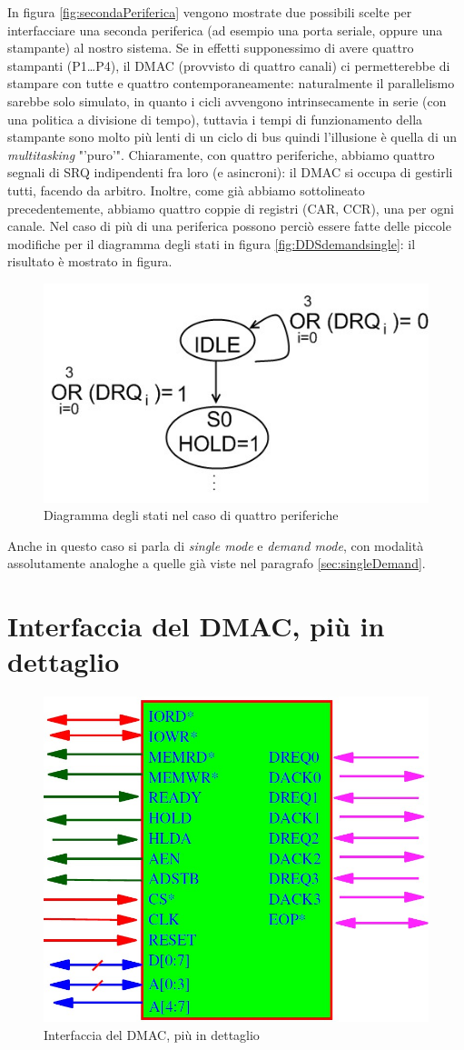 In figura \ref{fig:secondaPeriferica} vengono mostrate due possibili scelte per interfacciare una seconda periferica (ad esempio una porta seriale, oppure una stampante) al nostro sistema.
Se in effetti supponessimo di avere quattro stampanti (P1\ldots P4), il DMAC (provvisto di quattro canali) ci permetterebbe di stampare con tutte e quattro contemporaneamente: naturalmente il parallelismo sarebbe solo simulato, in quanto i cicli avvengono intrinsecamente in serie (con una politica a divisione di tempo), tuttavia i tempi di funzionamento della stampante sono molto più lenti di un ciclo di bus quindi l'illusione è quella di un \textit{multitasking} "'puro'".
Chiaramente, con quattro periferiche, abbiamo quattro segnali di SRQ indipendenti fra loro (e asincroni): il DMAC si occupa di gestirli tutti, facendo da arbitro. Inoltre, come già abbiamo sottolineato precedentemente, abbiamo quattro coppie di registri (CAR, CCR), una per ogni canale. 
Nel caso di più di una periferica possono perciò essere fatte delle piccole modifiche per il diagramma degli stati in figura \ref{fig:DDSdemandsingle}: il risultato è mostrato in figura.

\begin{figure}[!h]
\centering
\includegraphics[width=0.55\columnwidth]{img/modifica3periferiche}
\caption{Diagramma degli stati nel caso di quattro periferiche}
\label{fig:modifica3periferiche}
\end{figure}

Anche in questo caso si parla di \textit{single mode} e \textit{demand mode}, con modalità assolutamente analoghe a quelle già viste nel paragrafo \ref{sec:singleDemand}.



\section{Interfaccia del DMAC, più in dettaglio}
\label{sec:interfacciaDMACDettaglio}

\begin{figure}[!h]
\centering
\includegraphics[width=0.45\columnwidth]{img/piediniDMAC}
\caption{Interfaccia del DMAC, più in dettaglio}
\label{fig:piediniDMAC}
\end{figure}

